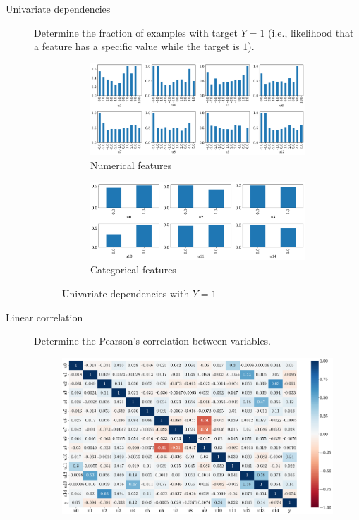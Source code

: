 \begin{description}
    \item[Univariate dependencies]
        Determine the fraction of examples with target $Y=1$ (i.e., likelihood that a feature has a specific value while the target is $1$).

        \begin{figure}[H]
            \centering
            \begin{subfigure}{0.75\linewidth}
                \centering
                \includegraphics[width=\linewidth]{./img/_biomed_target_num_distr.pdf}
                \caption{Numerical features}
            \end{subfigure}
            \begin{subfigure}{0.75\linewidth}
                \centering
                \includegraphics[width=\linewidth]{./img/_biomed_target_categ_distr.pdf}
                \caption{Categorical features}
            \end{subfigure}
            \caption{Univariate dependencies with $Y=1$}
        \end{figure}

    \item[Linear correlation]
        Determine the Pearson's correlation between variables.
        
        \begin{figure}[H]
            \centering
            \includegraphics[width=0.8\linewidth]{./img/_biomed_corr_matrix.pdf}
        \end{figure}
\end{description}